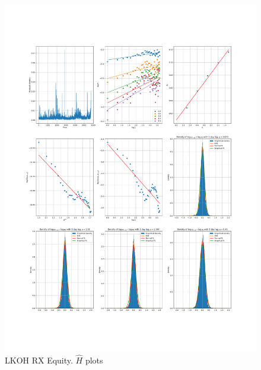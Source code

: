     \begin{figure}[h]
        \centering
        \includegraphics[width=\textwidth]{fig/LKOH RX Equity.pdf}
        \caption{LKOH RX Equity. $\hat{H}$ plots}
    \end{figure} 
        
